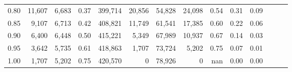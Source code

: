 \begin{tabular}{rrrrrrrrrrrrrr}
0.80 &  11,607 &  6,683 &  0.37 &  399,714 &   20,856 &  54,828 &  24,098 &  0.54 &  0.31 &      0.09 \\
0.85 &   9,107 &  6,713 &  0.42 &  408,821 &   11,749 &  61,541 &  17,385 &  0.60 &  0.22 &      0.06 \\
0.90 &   6,400 &  6,448 &  0.50 &  415,221 &    5,349 &  67,989 &  10,937 &  0.67 &  0.14 &      0.03 \\
0.95 &   3,642 &  5,735 &  0.61 &  418,863 &    1,707 &  73,724 &   5,202 &  0.75 &  0.07 &      0.01 \\
1.00 &   1,707 &  5,202 &  0.75 &  420,570 &        0 &  78,926 &       0 &   nan &  0.00 &      0.00 \\
\bottomrule
\end{tabular}
